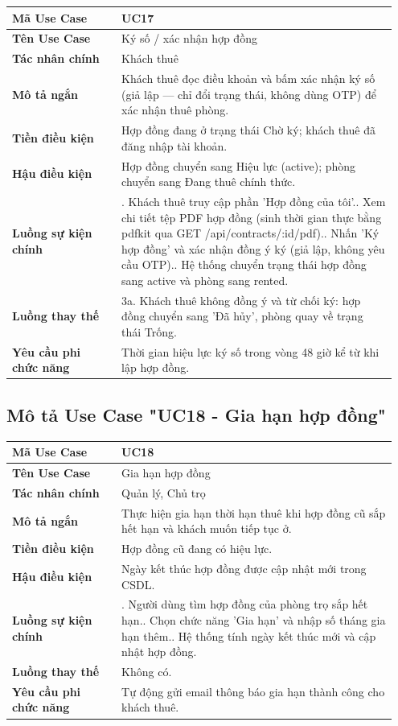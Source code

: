 \documentclass[a4paper,oneside]{report}
\begin{document}
\begin{longtable}[]{@{}>{\RaggedRight\arraybackslash}p{0.27\linewidth}>{\RaggedRight\arraybackslash}p{0.68\linewidth}@{}}
\toprule
\textbf{Mã Use Case} & UC17\tabularnewline
\midrule
\endhead
\textbf{Tên Use Case} & Ký số / xác nhận hợp đồng\tabularnewline
\textbf{Tác nhân chính} & Khách thuê\tabularnewline
\textbf{Mô tả ngắn} & Khách thuê đọc điều khoản và bấm xác nhận ký số
(giả lập --- chỉ đổi trạng thái, không dùng OTP) để xác nhận thuê
phòng.\tabularnewline
\textbf{Tiền điều kiện} & Hợp đồng đang ở trạng thái Chờ ký; khách thuê
đã đăng nhập tài khoản.\tabularnewline
\textbf{Hậu điều kiện} & Hợp đồng chuyển sang Hiệu lực (active); phòng
chuyển sang Đang thuê chính thức.\tabularnewline
\textbf{Luồng sự kiện chính} & 1. Khách thuê truy cập
phần 'Hợp đồng của tôi'.\newline 2. Xem chi tiết tệp PDF hợp đồng
(sinh thời gian thực bằng pdfkit qua GET
/api/contracts/:id/pdf).\newline 3. Nhấn 'Ký hợp đồng' và xác nhận
đồng ý ký (giả lập, không yêu cầu OTP).\newline 4. Hệ thống chuyển
trạng thái hợp đồng sang active và phòng sang rented.\tabularnewline
\textbf{Luồng thay thế} & 3a. Khách thuê không đồng ý và từ chối ký: hợp
đồng chuyển sang 'Đã hủy', phòng quay về trạng thái
Trống.\tabularnewline
\textbf{Yêu cầu phi chức năng} & Thời gian hiệu lực ký số trong vòng 48
giờ kể từ khi lập hợp đồng.\tabularnewline
\bottomrule
\end{longtable}

\subsection{Mô tả Use Case "UC18 - Gia hạn hợp đồng"}

\begin{longtable}[]{@{}>{\RaggedRight\arraybackslash}p{0.27\linewidth}>{\RaggedRight\arraybackslash}p{0.68\linewidth}@{}}
\toprule
\textbf{Mã Use Case} & UC18\tabularnewline
\midrule
\endhead
\textbf{Tên Use Case} & Gia hạn hợp đồng\tabularnewline
\textbf{Tác nhân chính} & Quản lý, Chủ trọ\tabularnewline
\textbf{Mô tả ngắn} & Thực hiện gia hạn thời hạn thuê khi hợp đồng cũ
sắp hết hạn và khách muốn tiếp tục ở.\tabularnewline
\textbf{Tiền điều kiện} & Hợp đồng cũ đang có hiệu lực.\tabularnewline
\textbf{Hậu điều kiện} & Ngày kết thúc hợp đồng được cập nhật mới trong
CSDL.\tabularnewline
\textbf{Luồng sự kiện chính} & 1. Người dùng tìm hợp
đồng của phòng trọ sắp hết hạn.\newline 2. Chọn chức năng 'Gia hạn'
và nhập số tháng gia hạn thêm.\newline 3. Hệ thống tính ngày kết
thúc mới và cập nhật hợp đồng.\tabularnewline
\textbf{Luồng thay thế} & Không có.\tabularnewline
\textbf{Yêu cầu phi chức năng} & Tự động gửi email thông báo gia hạn
thành công cho khách thuê.\tabularnewline
\bottomrule
\end{longtable}
\end{document}
